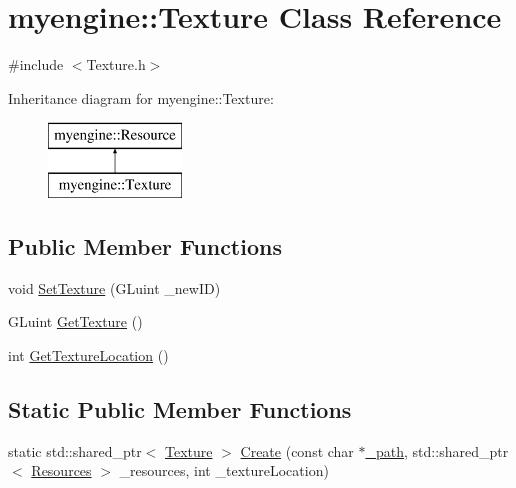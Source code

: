 \hypertarget{classmyengine_1_1_texture}{}\section{myengine\+:\+:Texture Class Reference}
\label{classmyengine_1_1_texture}


{\ttfamily \#include $<$Texture.\+h$>$}

Inheritance diagram for myengine\+:\+:Texture\+:\begin{figure}[H]
\begin{center}
\leavevmode
\includegraphics[height=2.000000cm]{classmyengine_1_1_texture}
\end{center}
\end{figure}
\subsection*{Public Member Functions}
\begin{DoxyCompactItemize}
\item 
void \hyperlink{classmyengine_1_1_texture_af178f6cbc4278bcc884a5651025d3dd9}{Set\+Texture} (G\+Luint \+\_\+new\+ID)
\item 
G\+Luint \hyperlink{classmyengine_1_1_texture_a10d2ae38dd467e9504f40df51ffa3c05}{Get\+Texture} ()
\item 
int \hyperlink{classmyengine_1_1_texture_a0bd0dcd679577e615bebec083c2da604}{Get\+Texture\+Location} ()
\end{DoxyCompactItemize}
\subsection*{Static Public Member Functions}
\begin{DoxyCompactItemize}
\item 
static std\+::shared\+\_\+ptr$<$ \hyperlink{classmyengine_1_1_texture}{Texture} $>$ \hyperlink{classmyengine_1_1_texture_a9796bf3a45107868c9371b869ff5a4e1}{Create} (const char $\ast$\hyperlink{classmyengine_1_1_resource_af7057ebf099efbd80751c64d25c2c83d}{\+\_\+path}, std\+::shared\+\_\+ptr$<$ \hyperlink{classmyengine_1_1_resources}{Resources} $>$ \+\_\+resources, int \+\_\+texture\+Location)
\end{DoxyCompactItemize}
